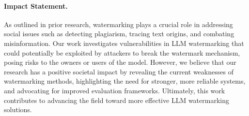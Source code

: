 \paragraph{Impact Statement.}
As outlined in prior research, watermarking plays a crucial role in addressing social issues such as detecting plagiarism, tracing text origins, and combating misinformation. Our work investigates vulnerabilities in LLM watermarking that could potentially be exploited by attackers to break the watermark mechanism, posing risks to the owners or users of the model. However, we believe that our research has a positive societal impact by revealing the current weaknesses of watermarking methods, highlighting the need for stronger, more reliable systems, and advocating for improved evaluation frameworks. Ultimately, this work contributes to advancing the field toward more effective LLM watermarking solutions. 
